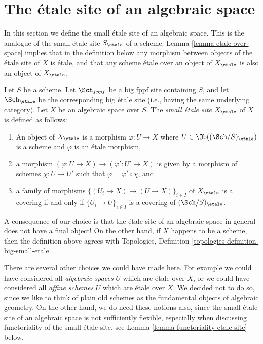 








\section{The \'etale site of an algebraic space}
\label{section-etale-site}

\noindent
In this section we define the small \'etale site of an algebraic space.
This is the analogue of the small \'etale site $S_\etale$ of a scheme.
Lemma \ref{lemma-etale-over-space} implies that in the definition below
any morphism between objects of the \'etale site of $X$ is \'etale, and that
any scheme \'etale over an object of $X_\etale$ is also an object of
$X_\etale$.

\begin{definition}
\label{definition-etale-site}
Let $S$ be a scheme.
Let $\Sch_{fppf}$ be a big fppf site containing $S$,
and let $\Sch_\etale$ be the corresponding big \'etale site
(i.e., having the same underlying category).
Let $X$ be an algebraic space over $S$.
The {\it small \'etale site $X_\etale$} of $X$ is defined as follows:
\begin{enumerate}
\item An object of $X_\etale$ is a morphism $\varphi : U \to X$
where $U \in \Ob((\Sch/S)_\etale)$ is a scheme and
$\varphi$ is an \'etale morphism,
\item a morphism $(\varphi : U \to X) \to (\varphi' : U' \to X)$
is given by a morphism of schemes $\chi : U \to U'$ such that
$\varphi = \varphi' \circ \chi$, and
\item a family of morphisms $\{(U_i \to X) \to (U \to X)\}_{i \in I}$
of $X_\etale$ is a covering if and only if $\{U_i \to U\}_{i \in I}$
is a covering of $(\Sch/S)_\etale$.
\end{enumerate}
\end{definition}

\noindent
A consequence of our choice is that the \'etale site of an algebraic space
in general does not have a final object! On the other hand, if $X$ happens
to be a scheme, then the definition above agrees with
Topologies, Definition \ref{topologies-definition-big-small-etale}.

\medskip\noindent
There are several other choices we could have made here. For example
we could have considered all {\it algebraic spaces} $U$ which are \'etale
over $X$, or we could have considered all {\it affine schemes} $U$ which
are \'etale over $X$. We decided not to do so, since we like to think of
plain old schemes as the fundamental objects of algebraic geometry. On
the other hand, we do need these notions also, since the small \'etale site
of an algebraic space is not sufficiently flexible, especially when
discussing functoriality of the small \'etale site, see
Lemma \ref{lemma-functoriality-etale-site}
below.

